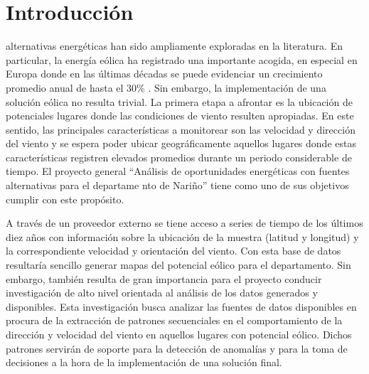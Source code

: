 \section{Introducción}

 alternativas energéticas han sido ampliamente exploradas en la
 literatura.
 En particular, la energía eólica ha registrado una importante acogida,
 en especial en Europa donde en las últimas décadas se puede evidenciar
 un crecimiento promedio anual de hasta el 30\% \cite{ewea2004windindustry}.
 Sin embargo, la implementación de una solución eólica no resulta trivial.
 La primera etapa a afrontar es la ubicación de potenciales lugares donde
 las condiciones de viento resulten apropiadas.
 En este sentido, las principales características a monitorear son las velocidad
 y dirección del viento y se espera poder ubicar geográficamente aquellos
 lugares donde estas características registren elevados promedios durante
 un periodo considerable de tiempo. El proyecto general ``Análisis de oportunidades
 energéticas con fuentes alternativas para el departame
nto de Nariño'' tiene como uno de sus objetivos cumplir con este propósito.

A través de un proveedor externo se tiene acceso a series de tiempo de los
 últimos diez años con información sobre la ubicación de la muestra (latitud
 y longitud) y la correspondiente velocidad y orientación del viento.
 Con esta base de datos resultaría sencillo generar mapas del potencial
 eólico para el departamento.
 Sin embargo, también resulta de gran importancia para el proyecto conducir
 investigación de alto nivel orientada al análisis de los datos generados
 y disponibles.
 Esta investigación busca analizar las fuentes de datos disponibles en procura
 de la extracción de patrones secuenciales en el comportamiento de la dirección
 y velocidad del viento en aquellos lugares con potencial eólico.
 Dichos patrones servirán de soporte para la detección de anomalías y para
 la toma de decisiones a la hora de la implementación de una solución final.